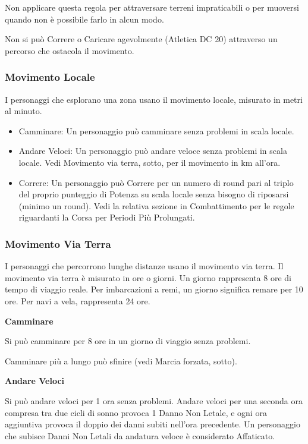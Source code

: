 \documentclass[a4paper,11pt,twoside,openany]{book}
\begin{document}
Non applicare questa regola per attraversare terreni impraticabili o per muoversi quando non è possibile farlo in alcun modo.

Non si può Correre o Caricare agevolmente (Atletica DC 20) attraverso un percorso che ostacola il movimento.

\subsubsection{Movimento Locale}

I personaggi che esplorano una zona usano il movimento locale, misurato in metri al minuto.
\begin{itemize}
	\item
	      Camminare: Un personaggio può camminare senza problemi in scala locale.
	\item
	      Andare Veloci: Un personaggio può andare veloce senza problemi in scala locale. Vedi Movimento via terra, sotto, per il movimento in km all'ora.
	\item
	      Correre: Un personaggio può Correre per un numero di round pari al triplo del proprio punteggio di Potenza su scala locale senza bisogno di riposarsi (minimo un round). Vedi la relativa sezione in Combattimento per le regole riguardanti la Corsa per Periodi Più Prolungati.
\end{itemize}

\subsubsection{Movimento Via Terra}

I personaggi che percorrono lunghe distanze usano il movimento via terra. Il movimento via terra è misurato in ore o giorni. Un giorno rappresenta 8 ore di tempo di viaggio reale. Per imbarcazioni a remi, un giorno significa remare per 10 ore. Per navi a vela, rappresenta 24 ore.

\textbf{Camminare}

Si può camminare per 8 ore in un giorno di viaggio senza problemi.

Camminare più a lungo può sfinire (vedi Marcia forzata, sotto).

\textbf{Andare Veloci}

Si può andare veloci per 1 ora senza problemi. Andare veloci per una seconda ora compresa tra due cicli di sonno provoca 1 Danno Non Letale, e ogni ora aggiuntiva provoca il doppio dei danni subiti nell'ora precedente. Un personaggio che subisce Danni Non Letali da andatura veloce è considerato Affaticato.
\end{document}
